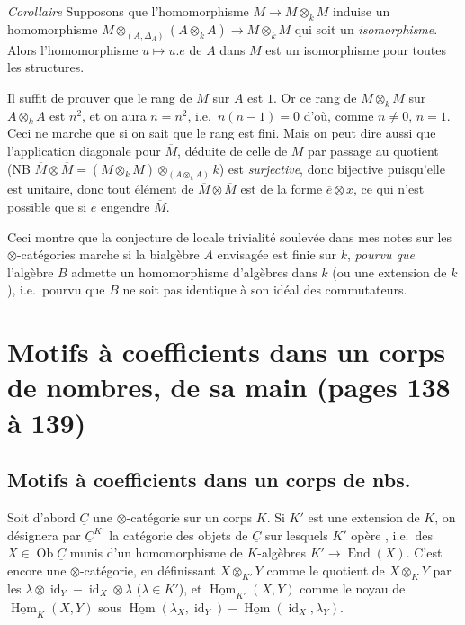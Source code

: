 \documentclass[11pt,a4paper]{article}
\begin{document}

\emph{Corollaire} Supposons que l'homomorphisme
$M \to M \otimes_{k} M$ induise un homomorphisme
$M \otimes_{(A,\Delta_{A})} (A \otimes_{k} A) \to M \otimes_{k} M$
 qui soit un \emph{isomorphisme}. Alors
l'homomorphisme $u \mapsto u.e$ de $A$ dans $M$ est un isomorphisme pour toutes
les structures.

Il suffit de prouver que le rang de $M$ sur $A$ est $1$. Or ce rang de
$M \otimes_{k} M$ sur $A \otimes_{k} A$ est $n^{2}$, et on aura $n = n^{2}$,
i.e.\ $n(n-1) = 0$ d'où, comme $n \neq 0$, $n = 1$. Ceci ne marche que si on
sait que le rang est fini. Mais on peut dire aussi que l'application diagonale
pour $\overline{M}$, déduite de celle de $M$ par passage au quotient (NB
$\overline{M} \otimes \overline{M} = (M \otimes_{k} M) \otimes_{(A \otimes_{k}
A)} k$) est \emph{surjective}, donc bijective puisqu'elle est unitaire,
donc tout élément de $\overline{M} \otimes \overline{M}$ est de la forme
$\overline{e} \otimes x$, ce qui n'est possible que si $\overline{e}$ engendre
$\overline{M}$.

Ceci montre que la conjecture de locale trivialité soulevée dans mes notes sur
les $\otimes$-catégories marche si la bialgèbre $A$ envisagée est finie sur $k$,
 \emph{pourvu que} l'algèbre $B$ admette
un homomorphisme d'algèbres dans $k$ (ou une extension de $k$), i.e.\ pourvu que
$B$ ne soit pas identique à son idéal des commutateurs.

\section*{Motifs à coefficients dans un corps de nombres, de sa main (pages 138 à 139)}



\subsection*{Motifs à coefficients dans un corps de nbs.}

Soit d'abord $\underline{C}$ une $\otimes$-catégorie sur un corps $K$. Si $K'$
est une extension  de $K$, on désignera par $\underline{C}^{K'}$ la
catégorie des objets de $\underline{C}$ sur lesquels $K'$ opère
, i.e.\ des $X \in \operatorname{Ob} \underline{C}$
munis d'un homomorphisme de $K$-algèbres $K' \to \operatorname{End}(X)$. C'est
encore une $\otimes$-catégorie, en définissant $X \otimes_{K'} Y$ comme le
quotient de $X \otimes_{K} Y$ par les
$\lambda \otimes \operatorname{id}_{Y} - \operatorname{id}_{X} \otimes \lambda$
($\lambda \in K'$), et $\underline{\operatorname{Hom}}_{K'}(X,Y)$ comme le noyau
de $\underline{\operatorname{Hom}}_{K}(X,Y)$ sous
$\underline{\operatorname{Hom}}(\lambda_{X},\operatorname{id}_{Y})
- \underline{\operatorname{Hom}}(\operatorname{id}_{X},\lambda_{Y})$.
\end{document}
